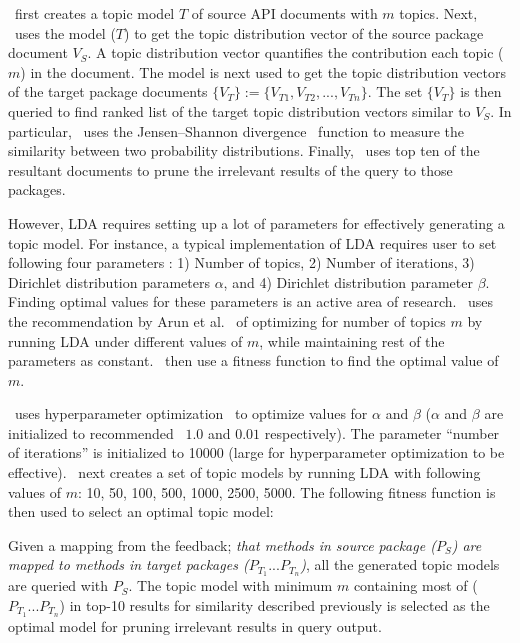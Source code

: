 \tool\ first creates a topic model $T$ of source API documents with $m$ topics.
Next, \tool\ uses the model ($T$) to get the topic distribution vector of the source package document $V_{S}$.
A topic distribution vector quantifies the contribution each topic ($m$) in the document.
The model is next used to get the topic distribution vectors of the target package documents $\{V_{T}\}:=\{V_{T1},V_{T2},...,V_{Tn}\}$.
The set $\{V_{T}\}$ is then queried to find ranked list of the target topic distribution vectors similar to $V_{S}$.
In particular, \tool\ uses the Jensen–Shannon divergence~\cite{lin1991divergence} function to measure the similarity between two probability distributions. 
Finally, \tool\ uses top ten of the resultant documents to prune the irrelevant results of the query to those packages.

However, LDA requires setting up a lot of parameters for effectively generating a topic model.
For instance, a typical implementation of LDA requires user to set following four parameters : 1) Number of topics, 2) Number of iterations, 3) Dirichlet distribution parameters $\alpha$, and 4) Dirichlet distribution parameter $\beta$.
Finding optimal values for these parameters is an active area of research.
\tool\ uses the recommendation by Arun et al.~\cite{arun2010finding} of optimizing for number of topics $m$ by running LDA under different values of $m$, while maintaining rest of the parameters as constant.
\tool\ then use a fitness function to find the optimal value of $m$.


\tool\ uses hyperparameter optimization~\cite{mccallum2002mallet} to optimize values for $\alpha$ and $\beta$ ($\alpha$ and $\beta$ are initialized to recommended~\cite{mccallum2002mallet} $1.0$ and $0.01$ respectively).
The parameter ``number of iterations'' is initialized to 10000 (large for hyperparameter optimization to be effective).
\tool\ next creates a set of topic models by running LDA with following values of $m$: 10, 50, 100, 500, 1000, 2500, 5000.
The following fitness function is then used to select an optimal topic model:

Given a mapping from the feedback; \textit{that methods in source package ($P_S$) are mapped to methods in target packages ($P_{T_1}...P_{T_n}$)}, all the generated topic models are queried with $P_S$.
The topic model with minimum $m$ containing most of ($P_{T_1}...P_{T_n}$) in top-10 results for similarity described previously is selected as the optimal model for pruning irrelevant results in query output. 




